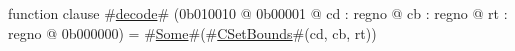 function clause #\hyperref[zdecode]{decode}# (0b010010 @ 0b00001 @ cd : regno @ cb : regno @ rt : regno @ 0b000000)      = #\hyperref[zSome]{Some}#(#\hyperref[zCSetBounds]{CSetBounds}#(cd, cb, rt))
